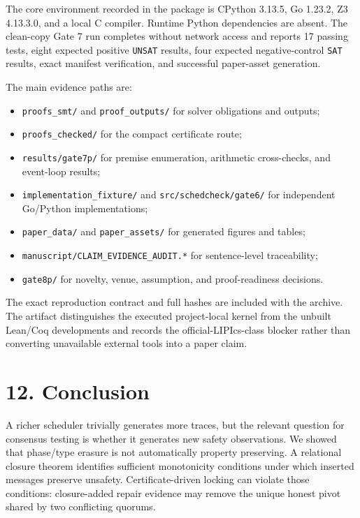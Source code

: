 \documentclass[10pt,a4paper]{article}
\newcommand{\tightlist}{\setlength{\itemsep}{0pt}\setlength{\parskip}{0pt}}
\begin{document}
The core environment recorded in the package is CPython 3.13.5, Go
1.23.2, Z3 4.13.3.0, and a local C compiler. Runtime Python dependencies
are absent. The clean-copy Gate 7 run completes without network access
and reports 17 passing tests, eight expected positive \texttt{UNSAT}
results, four expected negative-control \texttt{SAT} results, exact
manifest verification, and successful paper-asset generation.

The main evidence paths are:

\begin{itemize}
\tightlist
\item
  \texttt{proofs\_smt/} and \texttt{proof\_outputs/} for solver
  obligations and outputs;
\item
  \texttt{proofs\_checked/} for the compact certificate route;
\item
  \texttt{results/gate7p/} for premise enumeration, arithmetic
  cross-checks, and event-loop results;
\item
  \texttt{implementation\_fixture/} and \texttt{src/schedcheck/gate6/}
  for independent Go/Python implementations;
\item
  \texttt{paper\_data/} and \texttt{paper\_assets/} for generated
  figures and tables;
\item
  \texttt{manuscript/CLAIM\_EVIDENCE\_AUDIT.*} for sentence-level
  traceability;
\item
  \texttt{gate8p/} for novelty, venue, assumption, and proof-readiness
  decisions.
\end{itemize}

The exact reproduction contract and full hashes are included with the
archive. The artifact distinguishes the executed project-local kernel
from the unbuilt Lean/Coq developments and records the
official-LIPIcs-class blocker rather than converting unavailable
external tools into a paper claim.

\section{12. Conclusion}\label{conclusion}

A richer scheduler trivially generates more traces, but the relevant
question for consensus testing is whether it generates new safety
observations. We showed that phase/type erasure is not automatically
property preserving. A relational closure theorem identifies sufficient
monotonicity conditions under which inserted messages preserve unsafety.
Certificate-driven locking can violate those conditions: closure-added
repair evidence may remove the unique honest pivot shared by two
conflicting quorums.
\end{document}
